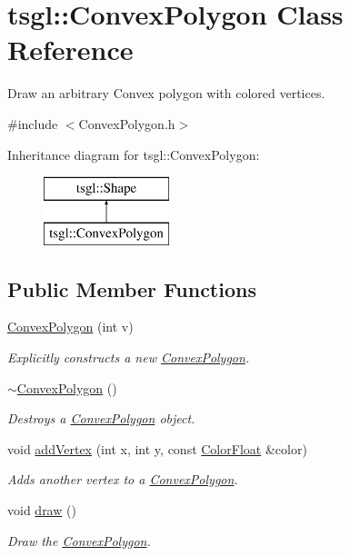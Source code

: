 \hypertarget{classtsgl_1_1_convex_polygon}{}\section{tsgl\+:\+:Convex\+Polygon Class Reference}
\label{classtsgl_1_1_convex_polygon}


Draw an arbitrary Convex polygon with colored vertices.  




{\ttfamily \#include $<$Convex\+Polygon.\+h$>$}

Inheritance diagram for tsgl\+:\+:Convex\+Polygon\+:\begin{figure}[H]
\begin{center}
\leavevmode
\includegraphics[height=2.000000cm]{classtsgl_1_1_convex_polygon}
\end{center}
\end{figure}
\subsection*{Public Member Functions}
\begin{DoxyCompactItemize}
\item 
\hyperlink{classtsgl_1_1_convex_polygon_a4ae2bd47b2a9f89aec5906c4e7ae3c10}{Convex\+Polygon} (int v)
\begin{DoxyCompactList}\small\item\em Explicitly constructs a new \hyperlink{classtsgl_1_1_convex_polygon}{Convex\+Polygon}. \end{DoxyCompactList}\item 
\hyperlink{classtsgl_1_1_convex_polygon_a46a5bde76d6843d47c754a04cc847e64}{$\sim$\+Convex\+Polygon} ()
\begin{DoxyCompactList}\small\item\em Destroys a \hyperlink{classtsgl_1_1_convex_polygon}{Convex\+Polygon} object. \end{DoxyCompactList}\item 
void \hyperlink{classtsgl_1_1_convex_polygon_a60d17a5ac80a796d05dfeff855791cc0}{add\+Vertex} (int x, int y, const \hyperlink{structtsgl_1_1_color_float}{Color\+Float} \&color)
\begin{DoxyCompactList}\small\item\em Adds another vertex to a \hyperlink{classtsgl_1_1_convex_polygon}{Convex\+Polygon}. \end{DoxyCompactList}\item 
void \hyperlink{classtsgl_1_1_convex_polygon_add4d4971a5d22385eebbfe771af916b5}{draw} ()
\begin{DoxyCompactList}\small\item\em Draw the \hyperlink{classtsgl_1_1_convex_polygon}{Convex\+Polygon}. \end{DoxyCompactList}\end{DoxyCompactItemize}
